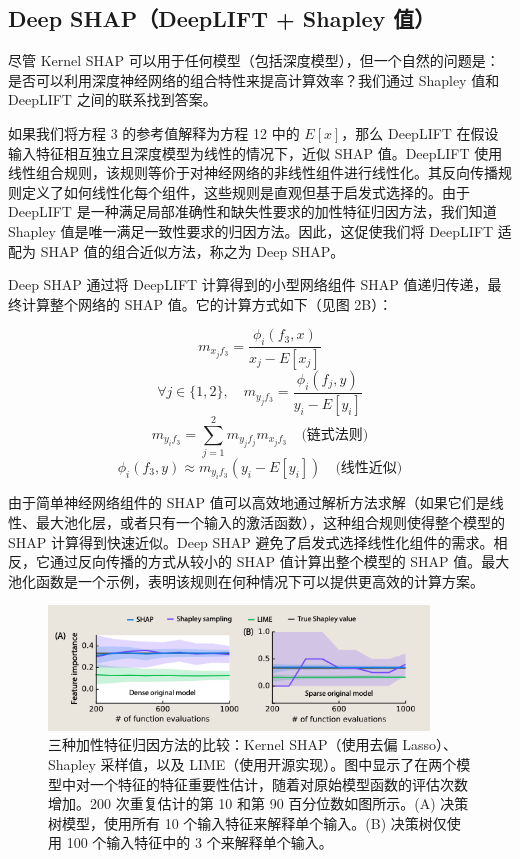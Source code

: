 \documentclass[12pt, a4paper]{ctexart} %
\begin{document}
\subsection*{Deep SHAP（DeepLIFT + Shapley 值）}

尽管 Kernel SHAP 可以用于任何模型（包括深度模型），但一个自然的问题是：是否可以利用深度神经网络的组合特性来提高计算效率？我们通过 Shapley 值和 DeepLIFT 之间的联系找到答案。

如果我们将方程 3 的参考值解释为方程 12 中的 $E[x]$，那么 DeepLIFT 在假设输入特征相互独立且深度模型为线性的情况下，近似 SHAP 值。DeepLIFT 使用线性组合规则，该规则等价于对神经网络的非线性组件进行线性化。其反向传播规则定义了如何线性化每个组件，这些规则是直观但基于启发式选择的。由于 DeepLIFT 是一种满足局部准确性和缺失性要求的加性特征归因方法，我们知道 Shapley 值是唯一满足一致性要求的归因方法。因此，这促使我们将 DeepLIFT 适配为 SHAP 值的组合近似方法，称之为 Deep SHAP。

Deep SHAP 通过将 DeepLIFT 计算得到的小型网络组件 SHAP 值递归传递，最终计算整个网络的 SHAP 值。它的计算方式如下（见图 2B）：

\[
m_{x_j f_3} = \frac{\phi_i(f_3, x)}{x_j - E[x_j]}
\]
\[
\forall j \in \{1,2\}, \quad m_{y_j f_3} = \frac{\phi_i(f_j, y)}{y_i - E[y_i]}
\]
\[
m_{y_i f_3} = \sum_{j=1}^{2} m_{y_j f_j} m_{x_j f_3} \quad \text{(链式法则)}
\]
\[
\phi_i(f_3, y) \approx m_{y_i f_3} (y_i - E[y_i]) \quad \text{(线性近似)}
\]

由于简单神经网络组件的 SHAP 值可以高效地通过解析方法求解（如果它们是线性、最大池化层，或者只有一个输入的激活函数），这种组合规则使得整个模型的 SHAP 计算得到快速近似。Deep SHAP 避免了启发式选择线性化组件的需求。相反，它通过反向传播的方式从较小的 SHAP 值计算出整个模型的 SHAP 值。最大池化函数是一个示例，表明该规则在何种情况下可以提供更高效的计算方案。

\begin{figure}[h]
    \centering
    \includegraphics[width=0.9\textwidth]{./img/img_3.png}
    \caption{三种加性特征归因方法的比较：Kernel SHAP（使用去偏 Lasso）、Shapley 采样值，以及 LIME（使用开源实现）。图中显示了在两个模型中对一个特征的特征重要性估计，随着对原始模型函数的评估次数增加。200 次重复估计的第 10 和第 90 百分位数如图所示。(A) 决策树模型，使用所有 10 个输入特征来解释单个输入。(B) 决策树仅使用 100 个输入特征中的 3 个来解释单个输入。}
\end{figure}
\end{document}

